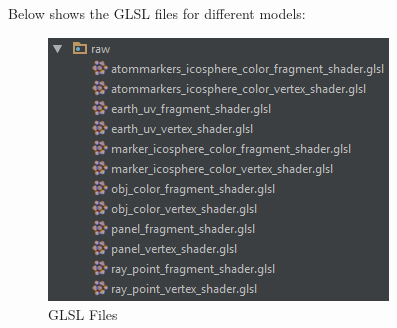 Below shows the GLSL files for different models:

\begin{figure}[H]
\caption{GLSL Files}
\label{fig:files-glsl}
\centering
\includegraphics[]{Figures/files-glsl.png}
\decoRule
\end{figure}

